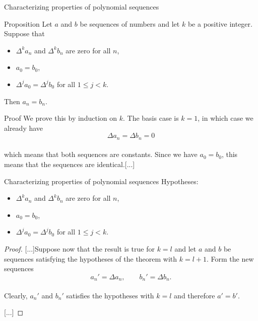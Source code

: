 \documentclass{beamer}
\def\bl[#1]#2{\begin{block}{#1}#2\end{block}}
\begin{document}
\begin{frame}{Characterizing properties of polynomial sequences}
\bl[Proposition]{
Let $a$ and $b$ be sequences of numbers and let $k$ be a positive integer. Suppose that
\begin{itemize}
\item $\Delta^ka_n$ and $\Delta^kb_n$ are zero for all $n$,
\item $a_0=b_0$,
\item $\Delta^ja_0=\Delta^jb_0$ for all $1\leq j<k$.
\end{itemize}
Then $a_n=b_n$.
}

\bl[Proof]{
We prove this by induction on $k$. The basis case is $k=1$, in which case we already have\vspace{-0.3cm}
\[
\Delta a_n=\Delta b_n=0
\]\\\vspace{-0.3cm}
which means that both sequences are constants. Since we have $a_0=b_0$, this means that the sequences are identical.[...]
}

\end{frame}

\begin{frame}{Characterizing properties of polynomial sequences}
Hypotheses:
\begin{itemize}
\item $\Delta^ka_n$ and $\Delta^kb_n$ are zero for all $n$,
\item $a_0=b_0$,
\item $\Delta^ja_0=\Delta^jb_0$ for all $1\leq j<k$.
\end{itemize}
\begin{proof}

[...]Suppose now that the result is true for $k=l$ and let $a$ and $b$ be sequences satisfying the hypotheses of the theorem with $k=l+1$. Form the new sequences\vspace{-0.2cm}
\[
a_n'=\Delta a_n,\qquad b_n'=\Delta b_n.
\]\\\vspace{-0.2cm}
Clearly, $a_n'$ and $b_n'$ satisfies the hypotheses with $k=l$ and therefore $a'=b'$.

[...]

\end{proof}
\end{frame}
\end{document}
